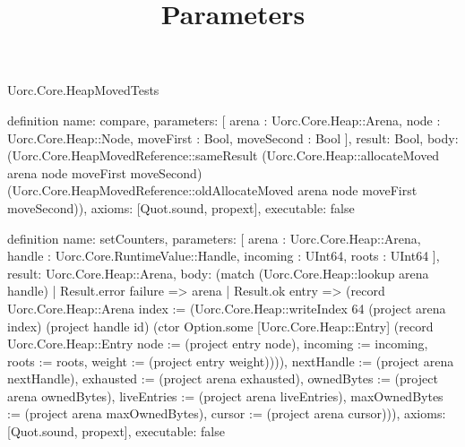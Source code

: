 \begin{lexlean}{Uorc.Core.HeapMovedTests}
\title{Parameters}
\begin{semanticmodule}
definition{
  name: compare,
  parameters: [
    arena : Uorc.Core.Heap::Arena,
    node : Uorc.Core.Heap::Node,
    moveFirst : Bool,
    moveSecond : Bool
  ],
  result: Bool,
  body: (Uorc.Core.HeapMovedReference::sameResult (Uorc.Core.Heap::allocateMoved arena node moveFirst moveSecond) (Uorc.Core.HeapMovedReference::oldAllocateMoved arena node moveFirst moveSecond)),
  axioms: [Quot.sound, propext],
  executable: false
}

definition{
  name: setCounters,
  parameters: [
    arena : Uorc.Core.Heap::Arena,
    handle : Uorc.Core.RuntimeValue::Handle,
    incoming : UInt64,
    roots : UInt64
  ],
  result: Uorc.Core.Heap::Arena,
  body: (match (Uorc.Core.Heap::lookup arena handle)
    | Result.error failure => arena
    | Result.ok entry => (record Uorc.Core.Heap::Arena {index := (Uorc.Core.Heap::writeIndex 64 (project arena index) (project handle id) (ctor Option.some [Uorc.Core.Heap::Entry] (record Uorc.Core.Heap::Entry {node := (project entry node), incoming := incoming, roots := roots, weight := (project entry weight)}))), nextHandle := (project arena nextHandle), exhausted := (project arena exhausted), ownedBytes := (project arena ownedBytes), liveEntries := (project arena liveEntries), maxOwnedBytes := (project arena maxOwnedBytes), cursor := (project arena cursor)})),
  axioms: [Quot.sound, propext],
  executable: false
}


\end{semanticmodule}
\end{lexlean}
